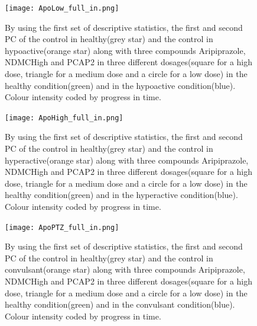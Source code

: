 \documentclass[a4paper,12pt]{article}
\begin{document}
\newpage
\begin{figure}[h!]
\begin{center}
\texttt{[image: ApoLow\_full\_in.png]}
\caption{By using the first set of descriptive statistics, the first and second PC of the control in healthy(grey star) and the control in hypoactive(orange star) along with three compounds Aripiprazole, NDMCHigh and PCAP2 in three different dosages(square for a high dose, triangle for a medium dose and a circle for a low dose) in the healthy condition(green) and in the hypoactive condition(blue). Colour intensity coded by progress in time.}
\end{center}
\end{figure}

\begin{figure}[h!]
\begin{center}
\texttt{[image: ApoHigh\_full\_in.png]}
\caption{By using the first set of descriptive statistics, the first and second PC of the control in healthy(grey star) and the control in hyperactive(orange star) along with three compounds Aripiprazole, NDMCHigh and PCAP2 in three different dosages(square for a high dose, triangle for a medium dose and a circle for a low dose) in the healthy condition(green) and in the hyperactive condition(blue). Colour intensity coded by progress in time.}
\end{center}
\end{figure}

\begin{figure}[h!]
\begin{center}
\texttt{[image: ApoPTZ\_full\_in.png]}
\caption{By using the first set of descriptive statistics, the first and second PC of the control in healthy(grey star) and the control in convulsant(orange star) along with three compounds Aripiprazole, NDMCHigh and PCAP2 in three different dosages(square for a high dose, triangle for a medium dose and a circle for a low dose) in the healthy condition(green) and in the convulsant condition(blue). Colour intensity coded by progress in time.}
\end{center}
\end{figure}
\end{document}
